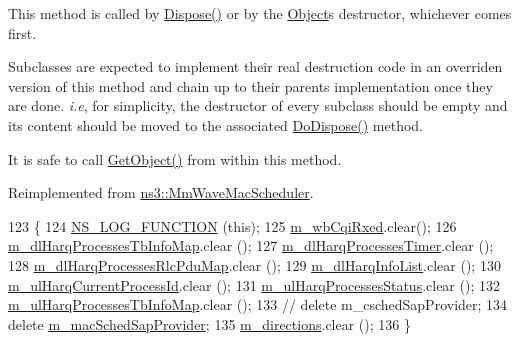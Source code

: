 This method is called by \hyperlink{classns3_1_1Object_aa90ae598863f6c251cdab3c3722afdaf}{Dispose()} or by the \hyperlink{classns3_1_1Object}{Object}\textquotesingle{}s destructor, whichever comes first.

Subclasses are expected to implement their real destruction code in an overriden version of this method and chain up to their parent\textquotesingle{}s implementation once they are done. {\itshape i.\+e}, for simplicity, the destructor of every subclass should be empty and its content should be moved to the associated \hyperlink{classns3_1_1MmWaveRrMacScheduler_a3e4831ffdd2b9253f7f0bd334b66e0e3}{Do\+Dispose()} method.

It is safe to call \hyperlink{classns3_1_1Object_a13e18c00017096c8381eb651d5bd0783}{Get\+Object()} from within this method. 

Reimplemented from \hyperlink{classns3_1_1MmWaveMacScheduler_a2ddcc9f234db5b831b81cfa653047640}{ns3\+::\+Mm\+Wave\+Mac\+Scheduler}.


\begin{DoxyCode}
123 \{
124         \hyperlink{log-macros-disabled_8h_a90b90d5bad1f39cb1b64923ea94c0761}{NS\_LOG\_FUNCTION} (\textcolor{keyword}{this});
125         \hyperlink{classns3_1_1MmWaveRrMacScheduler_ab048c846f6d5d71795b65b9f91c6766a}{m\_wbCqiRxed}.clear();
126   \hyperlink{classns3_1_1MmWaveRrMacScheduler_a8d14c222701c0a57ecbd40a51d0391da}{m\_dlHarqProcessesTbInfoMap}.clear ();
127   \hyperlink{classns3_1_1MmWaveRrMacScheduler_aa52dc4680386f8ccf85d6b9c685463d1}{m\_dlHarqProcessesTimer}.clear ();
128   \hyperlink{classns3_1_1MmWaveRrMacScheduler_a51e5c8d3c34be4e070f2fb3e621cd418}{m\_dlHarqProcessesRlcPduMap}.clear ();
129   \hyperlink{classns3_1_1MmWaveRrMacScheduler_a1b1043d7f9994e2ee6a7e1b368e9d7a1}{m\_dlHarqInfoList}.clear ();
130   \hyperlink{classns3_1_1MmWaveRrMacScheduler_a9d9d27b704770d34cb1ce158e9ed51ba}{m\_ulHarqCurrentProcessId}.clear ();
131   \hyperlink{classns3_1_1MmWaveRrMacScheduler_af963cfe7e5dc36fce45c16d60b506465}{m\_ulHarqProcessesStatus}.clear ();
132   \hyperlink{classns3_1_1MmWaveRrMacScheduler_a3fb20c8b0644fdd05f5545ec0b685b10}{m\_ulHarqProcessesTbInfoMap}.clear ();
133 \textcolor{comment}{//  delete m\_cschedSapProvider;}
134   \textcolor{keyword}{delete} \hyperlink{classns3_1_1MmWaveRrMacScheduler_af7bd93ab339121af06c7594fb83654c4}{m\_macSchedSapProvider};
135         \hyperlink{classns3_1_1MmWaveRrMacScheduler_ac4c00a9f08cd90ac861753f28c9d6a69}{m\_directions}.clear ();
136 \}
\end{DoxyCode}
